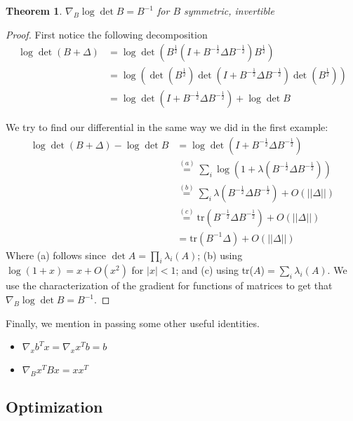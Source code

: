 \documentclass[]{article}
\theoremstyle{mattstyle}
\newtheorem{theorem}{Theorem}[section]
\theoremstyle{definition}
\begin{document}
\begin{theorem}
	$\nabla_{B} \log \det B = B^{-1}$ for $B$ symmetric, invertible
\end{theorem}
\begin{proof}
	First notice the following decomposition
\begin{align*}
\log \det (B + \Delta) &= \log \det\left(B^{\frac{1}{2}}\left(I + B^{-\frac{1}{2}}\Delta B^{-\frac{1}{2}}\right)B^{\frac{1}{2}}\right)\\
&= \log\left(\det\left( B^{\frac{1}{2}}\right) \det\left(I + B^{-\frac{1}{2}}\Delta B^{-\frac{1}{2}}\right) \det\left(B^{\frac{1}{2}}\right) \right)\\
&=\log\det\left(I + B^{-\frac{1}{2}}\Delta B^{-\frac{1}{2}}\right)+\log\det B
\end{align*}

We try to find our differential in the same way we did in the first example:
\begin{align*}
\log \det (B + \Delta) - \log\det B &= \log\det\left(I + B^{-\frac{1}{2}}\Delta B^{-\frac{1}{2}}\right)\\
&\overset{(a)}{=} \sum_{i} \log\left(1 + \lambda\left(B^{-\frac{1}{2}}\Delta B^{-\frac{1}{2}}\right)\right)\\
&\overset{(b)}{=} \sum_{i}\lambda\left(B^{-\frac{1}{2}}\Delta B^{-\frac{1}{2}}\right) + O(||\Delta||)\\
&\overset{(c)}{=} \text{tr}\left(B^{-\frac{1}{2}}\Delta B^{-\frac{1}{2}}\right) + O(||\Delta||)\\
&= \text{tr}(B^{-1}\Delta) + O(||\Delta||)
\end{align*}
Where (a) follows since $\det A = \prod_i \lambda_i(A)$; (b) using $\log(1+x)=x+O(x^2)$ for $|x|<1$; and (c) using tr($A$)$=\sum_i \lambda_i(A)$. 
We use the characterization of the gradient for functions of matrices to get that $\nabla_B \log\det B = B^{-1}$.
\end{proof}

Finally, we mention in passing some other useful identities.
\begin{itemize}
	\item $\nabla_{x} b^Tx = \nabla_{x} x^Tb= b$
	\item $\nabla_{B} x^TBx = xx^T$
\end{itemize}

\newpage

\subsection{Optimization}\label{sec:optim}
\end{document}
